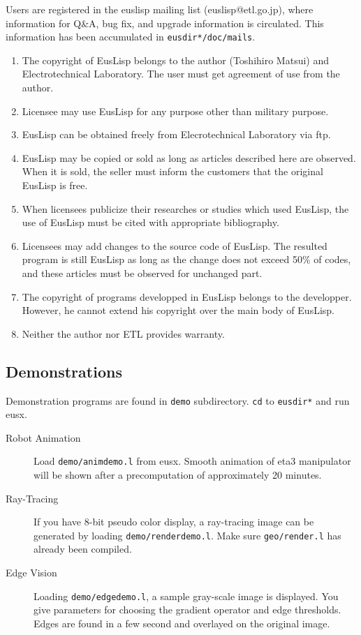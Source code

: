 Users are registered in the euslisp mailing list (euslisp@etl.go.jp),
where information for Q\&A, bug fix, and upgrade information is circulated.
This information has been accumulated in {\tt *eusdir*/doc/mails}.

\begin{enumerate}
\item The copyright of EusLisp belongs to
the author (Toshihiro Matsui) and Electrotechnical Laboratory.
The user must get agreement of use from the author.
\item Licensee may use EusLisp for any purpose other than military purpose.
\item EusLisp can be obtained freely from Elecrotechnical Laboratory
via ftp.
\item EusLisp may be copied or sold as long as articles described here
are observed. When it is sold, the seller must inform the customers
that the original EusLisp is free.
\item When licensees publicize their researches or studies which used EusLisp,
the use of EusLisp must be cited with appropriate bibliography.
\item Licensees may add changes to the source code of EusLisp.
The resulted program is still EusLisp as long as the
change does not exceed 50\% of codes,
and these articles must be observed for unchanged part.
\item The copyright of programs developped in EusLisp belongs to the
developper. However, he cannot extend his copyright over the main body
of EusLisp.
\item Neither the author nor ETL provides warranty.
\end{enumerate}

\subsection{Demonstrations}
Demonstration programs are found in {\tt demo} subdirectory.
{\tt cd} to {\tt *eusdir*} and run eusx.
\begin{description}
\item[Robot Animation] 
Load {\tt demo/animdemo.l} from eusx.
Smooth animation of eta3 manipulator will be shown after a
precomputation of approximately 20 minutes.
\item[Ray-Tracing] 
If you have 8-bit pseudo color display,
a ray-tracing image can be generated by loading
{\tt demo/renderdemo.l}.
Make sure {\tt geo/render.l} has already been compiled.
\item[Edge Vision]
Loading {\tt demo/edgedemo.l}, a sample gray-scale image is displayed.
You give parameters for choosing the gradient operator and 
edge thresholds.
Edges are found in a few second and overlayed on the original image.
\end{description}

